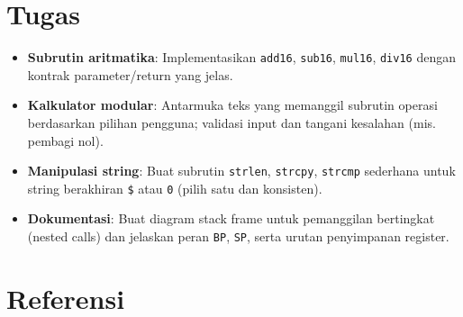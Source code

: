 \section{Tugas}
\begin{itemize}
  \item \textbf{Subrutin aritmatika}: Implementasikan \texttt{add16}, \texttt{sub16}, \texttt{mul16}, \texttt{div16} dengan kontrak parameter/return yang jelas.
  \item \textbf{Kalkulator modular}: Antarmuka teks yang memanggil subrutin operasi berdasarkan pilihan pengguna; validasi input dan tangani kesalahan (mis. pembagi nol).
  \item \textbf{Manipulasi string}: Buat subrutin \texttt{strlen}, \texttt{strcpy}, \texttt{strcmp} sederhana untuk string berakhiran \texttt{\$} atau \texttt{0} (pilih satu dan konsisten).
  \item \textbf{Dokumentasi}: Buat diagram stack frame untuk pemanggilan bertingkat (nested calls) dan jelaskan peran \texttt{BP}, \texttt{SP}, serta urutan penyimpanan register.
\end{itemize}

\section{Referensi}
